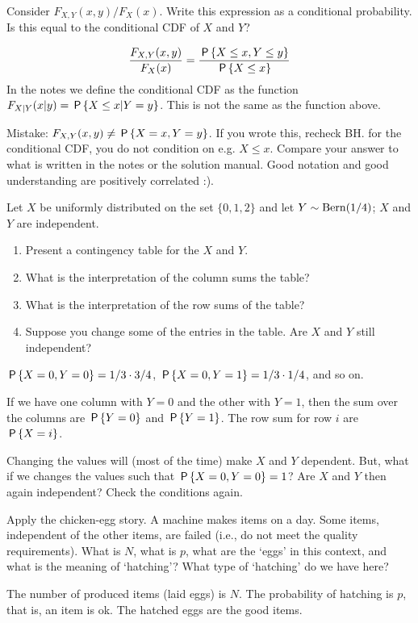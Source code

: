 \documentclass[assignments]{subfiles}
\begin{document}
\begin{exercise}
Consider $F_{X,Y}(x,y)/F_{X}(x)$. Write this expression as a conditional probability. Is this equal to the conditional CDF of $X$ and $Y$?
\begin{solution}

\begin{align}
  \label{}
\frac{F_{X,Y}(x,y)}{F_{X}(x)} = \frac{\P{X\leq x, Y\leq y}}{\P{X\leq x}}
\end{align}
In the notes we define the conditional CDF as the function $F_{X|Y}(x|y) = \P{X\leq x | Y=y}$. This is not the same as the function above.


Mistake: $F_{X,Y}(x,y) \neq \P{X=x, Y=y}$. If you wrote this, recheck BH.
for the conditional CDF, you do not condition on e.g. $X\leq x$.
Compare your answer to what is written in the notes or the solution manual. Good notation and good understanding are positively correlated :).
\end{solution}
\end{exercise}

\begin{exercise}
Let $X$ be uniformly distributed on the set $\{0,1,2\}$ and let $Y \sim \Bern{1/4}$; $X$ and $Y$ are independent.
\begin{enumerate}
\item Present a contingency table for the $X$ and $Y$.
\item What is the interpretation of the column sums the table?
\item What is the interpretation of the row sums of the table?
\item Suppose you change some of the entries in the table. Are $X$ and $Y$ still independent?
\end{enumerate}
\begin{solution}
$\P{X=0, Y=0} = 1/3 \cdot 3/4$,
$\P{X=0, Y=1} = 1/3 \cdot 1/4$, and so on.

If we have one column with $Y=0$ and the other with $Y=1$, then the sum over the columns are $\P{Y=0}$ and $\P{Y=1}$. The row sum for row $i$ are  $\P{X=i}$.

Changing the values will (most of the time) make $X$ and $Y$ dependent. But, what if we changes the values such that  $\P{X=0, Y=0} =1$? Are $X$ and $Y$ then again independent? Check the conditions again.
\end{solution}
\end{exercise}

\begin{exercise}
Apply the chicken-egg story.
A machine makes items on a day.
Some items, independent of the other items, are failed (i.e., do not meet the quality requirements).
What is $N$, what is $p$, what are the `eggs' in this context, and what is the meaning of `hatching'?
What type of `hatching' do we have here?
\begin{solution}
  The number of produced items (laid eggs) is $N$. The probability of hatching is $p$, that is, an item is ok. The hatched eggs are the good items.
\end{solution}
\end{exercise}
\end{document}
